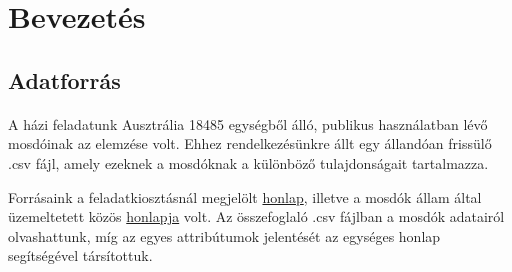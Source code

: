 		\section{Bevezetés}
		\subsection{Adatforrás}
		\paragraph{}	
		A házi feladatunk Ausztrália 18485 egységből álló, publikus használatban lévő mosdóinak az elemzése volt. Ehhez rendelkezésünkre állt egy állandóan frissülő .csv fájl, amely ezeknek a mosdóknak a különböző tulajdonságait tartalmazza.\par		
		Forrásaink a feladatkiosztásnál megjelölt \href{https://data.gov.au/dataset/national-public-toilet-map}{honlap}, illetve a mosdók állam által üzemeltetett közös \href{https://toiletmap.gov.au}{honlapja} volt. Az összefoglaló .csv fájlban a mosdók adatairól olvashattunk, míg az egyes attribútumok jelentését az egységes honlap segítségével társítottuk.
